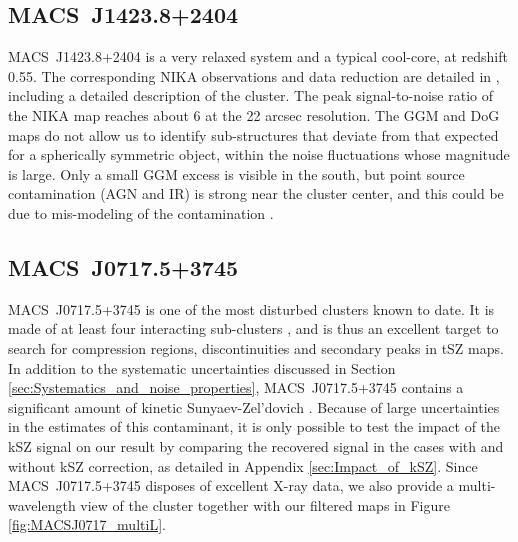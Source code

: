 \documentclass[twocolumn,traditabstract]{aa}
\begin{document}
\subsection{MACS~J1423.8+2404}
\mbox{MACS~J1423.8+2404} is a very relaxed system and a typical cool-core, at redshift 0.55. The corresponding NIKA observations and data reduction are detailed in \cite{Adam2016a}, including a detailed description of the cluster. The peak signal-to-noise ratio of the NIKA map reaches about 6 at the 22 arcsec resolution. The GGM and DoG maps do not allow us to identify sub-structures that deviate from that expected for a spherically symmetric object, within the noise fluctuations whose magnitude is large. Only a small GGM excess is visible in the south, but point source contamination (AGN and IR) is strong near the cluster center, and this could be due to mis-modeling of the contamination \citep[see][and the discussion of Section \ref{sec:Point_sources_residuals}]{Adam2016a}.

\subsection{MACS~J0717.5+3745}\label{sec:MACSJ0717}
\mbox{MACS~J0717.5+3745} is one of the most disturbed clusters known to date. It is made of at least four interacting sub-clusters \citep{Ma2009}, and is thus an excellent target to search for compression regions, discontinuities and secondary peaks in tSZ maps. In addition to the systematic uncertainties discussed in Section \ref{sec:Systematics_and_noise_properties}, \mbox{MACS~J0717.5+3745} contains a significant amount of kinetic Sunyaev-Zel'dovich \citep[kSZ,][]{Sunyaev1980}. Because of large uncertainties in the estimates of this contaminant, it is only possible to test the impact of the kSZ signal on our result by comparing the recovered signal in the cases with and without kSZ correction, as detailed in Appendix \ref{sec:Impact_of_kSZ}. Since \mbox{MACS~J0717.5+3745} disposes of excellent X-ray data, we also provide a multi-wavelength view of the cluster together with our filtered maps in Figure \ref{fig:MACSJ0717_multiL}.
\end{document}
